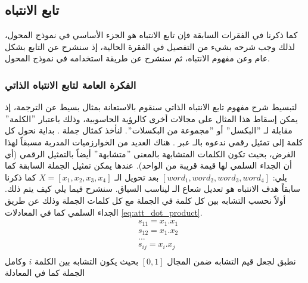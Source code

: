 \subsection{تابع الانتباه\label{att}}
كما ذكرنا في الفقرات السابقة فإن تابع الانتباه هو الجزء الأساسي في نموذج المحول، لذلك وجب شرحه بشيء من التفصيل في الفقرة الحالية، إذ سنشرح عن التابع بشكل عام وعن مفهوم الانتباه، ثم سنشرح عن طريقة استخدامه في نموذج المحول.
\subsubsection{الفكرة العامة لتابع الانتباه الذاتي 
\label{section:att_example}
}
لتبسيط شرح مفهوم تابع الانتباه الذاتي سنقوم بالاستعانة بمثال بسيط عن الترجمة، إذ يمكن إسقاط هذا المثال على مجالات أخرى كالرؤية الحاسوبية، وذلك باعتبار $"$الكلمة$"$ مقابلة لـ $"$البكسل$"$ أو $"$مجموعة من البكسلات$"$.
\newline
لنأخذ كمثال جملة 
.
\newline
بداية نحول كل كلمة إلى تمثيل رقمي ندعوه بالـ
عبر
.
هناك العديد من الخوارزميات المدربة مسبقاً لهذا الغرض، بحيث تكون الكلمات المتشابهة بالمعنى $"$متشابهة$"$ أيضاً بالتمثيل الرقمي (أي أن الجداء السلمي لها قيمة قريبة من الواحد). عندها يمكن تمثيل الجملة السابقة كما يلي:
\newline
{}
\newline
$[word_1, word_2, word_3, word_4]$
\newline
بعد تحويل الـ
\newline
$X = [x_1,x_2,x_3,x_4]$
\newline
كما ذكرنا سابقاً هدف الانتباه هو تعديل شعاع الـ
ليناسب السياق. سنشرح فيما يلي كيف يتم ذلك.
\newline
أولاً نحسب التشابه بين كل كلمة في الجملة مع كل كلمات الجملة وذلك عن طريق الجداء السلمي 
كما في المعادلات
\ref{eq:att_dot_product}.
\begin{equation}
\begin{split}
&s_{11} = x_1.x_1\\
&s_{12} = x_1.x_2\\
&\text{...}\\
&s_{ij} = x_i.x_j\\
\end{split}
\label{eq:att_dot_product}
\end{equation}
نطبق
لجعل قيم التشابه ضمن المجال
$[0,1]$
بحيث يكون التشابه بين الكلمة $i$ وكامل الجملة كما في المعادلة 
